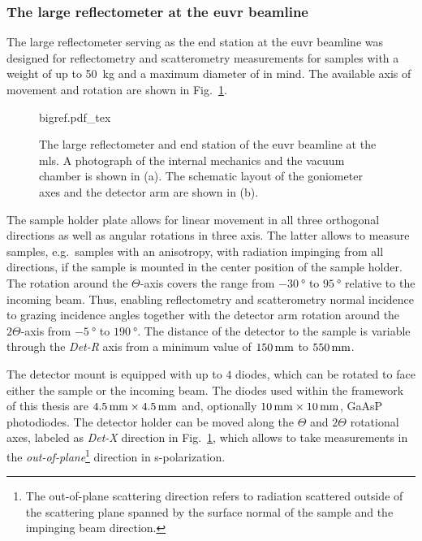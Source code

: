 \subsubsection{The large reflectometer at the \gls{euvr} beamline}
The large reflectometer serving as the end station at the \gls{euvr} beamline was designed for reflectometry and scatterometry measurements for samples with a weight of up to \SI{50}{\kg} and a maximum diameter of  in mind\cite{tummler_characterization_2003}. The available axis of movement and rotation are shown in Fig.~\ref{ch_exp:fig_bigref}.
\begin{figure}[htb]
    \def\svgwidth{\textwidth}
    {bigref.pdf_tex}
    \caption[The BigRef.]{The large reflectometer and end station of the \gls{euvr} beamline at the \gls{mls}. A photograph of the internal mechanics and the vacuum chamber is shown in (a). The schematic layout of the goniometer axes and the detector arm are shown in (b).}
    \label{ch_exp:fig_bigref}
\end{figure}
The sample holder plate allows for linear movement in all three orthogonal directions as well as angular rotations in three axis. The latter allows to measure samples, e.g.~samples with an anisotropy, with radiation impinging from all directions, if the sample is mounted in the center position of the sample holder. The rotation around the $\Theta$-axis covers the range from $\SI{-30}{\degree}$ to $\SI{95}{\degree}$ relative to the incoming beam. Thus, enabling reflectometry and scatterometry  normal incidence to grazing incidence angles together with the detector arm rotation around the $2\Theta$-axis from $\SI{-5}{\degree}$ to $\SI{190}{\degree}$. The distance of the detector to the sample is variable through the \emph{Det-R} axis from a minimum value of $\mm{150}$ to $\mm{550}$.

The detector mount is equipped with up to $4$ diodes, which can be rotated to face either the sample or the incoming beam. The diodes used within the framework of this thesis are $\mm{4.5} \times \mm{4.5}$ and, optionally $\mm{10} \times \mm{10}$, GaAsP photodiodes. The detector holder can be moved along the $\Theta$ and $2\Theta$ rotational axes, labeled as \emph{Det-X} direction in Fig.~\ref{ch_exp:fig_bigref}, which allows to take measurements in the \emph{out-of-plane}\footnote{The out-of-plane scattering direction refers to radiation scattered outside of the scattering plane spanned by the surface normal of the sample and the impinging beam direction.} direction in s-polarization.


